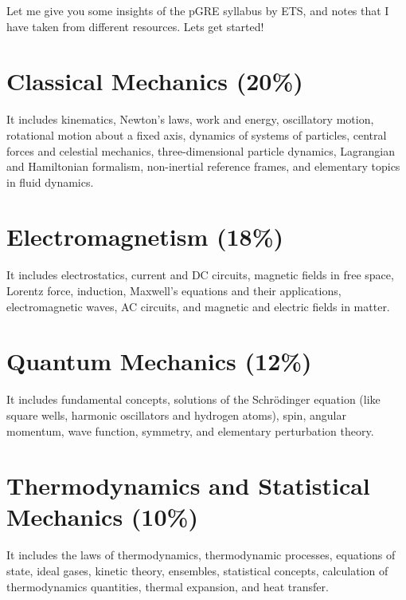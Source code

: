 \documentclass[12pt,a4paper]{article}
\begin{document}
Let me give you some insights of the pGRE syllabus by ETS, and notes that I have taken from different resources. Lets get started!

\section{Classical Mechanics (20\%)}

\quad It includes kinematics, Newton's laws, work and energy, oscillatory motion, rotational motion about a fixed axis, dynamics of systems of particles, central forces and celestial mechanics, three-dimensional particle dynamics, Lagrangian and Hamiltonian formalism, non-inertial reference frames, and elementary topics in fluid dynamics.


\section{Electromagnetism (18\%)}

\quad It includes electrostatics, current and DC circuits, magnetic fields in free space, Lorentz force, induction, Maxwell's equations and their applications, electromagnetic waves, AC circuits, and magnetic and electric fields in matter.

\section{Quantum Mechanics (12\%)}

\quad It includes fundamental concepts, solutions of the Schr\"{o}dinger equation (like square wells, harmonic oscillators and hydrogen atoms), spin, angular momentum, wave function, symmetry, and elementary perturbation theory.


\section{Thermodynamics and Statistical Mechanics (10\%)}

\quad It includes the laws of thermodynamics, thermodynamic processes, equations of state, ideal gases, kinetic theory, ensembles, statistical concepts, calculation of thermodynamics quantities, thermal expansion, and heat transfer.
\end{document}
